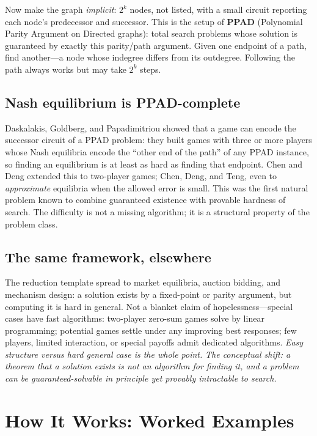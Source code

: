 Now make the graph \emph{implicit}: $2^k$ nodes, not listed, with a small circuit reporting each node's predecessor and successor. This is the setup of \textbf{PPAD} (Polynomial Parity Argument on Directed graphs): total search problems whose solution is guaranteed by exactly this parity/path argument. Given one endpoint of a path, find another---a node whose indegree differs from its outdegree. Following the path always works but may take $2^k$ steps.

\subsection{Nash equilibrium is PPAD-complete}

Daskalakis, Goldberg, and Papadimitriou showed that a game can encode the successor circuit of a PPAD problem: they built games with three or more players whose Nash equilibria encode the ``other end of the path'' of any PPAD instance, so finding an equilibrium is at least as hard as finding that endpoint. Chen and Deng extended this to two-player games; Chen, Deng, and Teng, even to \emph{approximate} equilibria when the allowed error is small. This was the first natural problem known to combine guaranteed existence with provable hardness of search. The difficulty is not a missing algorithm; it is a structural property of the problem class.

\subsection{The same framework, elsewhere}

The reduction template spread to market equilibria, auction bidding, and mechanism design: a solution exists by a fixed-point or parity argument, but computing it is hard in general. Not a blanket claim of hopelessness---special cases have fast algorithms: two-player zero-sum games solve by linear programming; potential games settle under any improving best responses; few players, limited interaction, or special payoffs admit dedicated algorithms. \emph{Easy structure versus hard general case is the whole point.}
\emph{The conceptual shift: a theorem that a solution exists is not an algorithm for finding it, and a problem can be guaranteed-solvable in principle yet provably intractable to search.}

\section{How It Works: Worked Examples}
